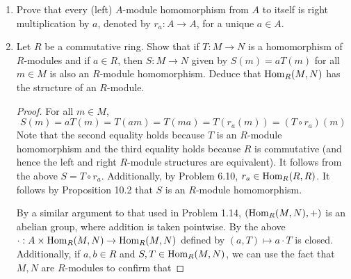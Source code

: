 \documentclass[../psets.tex]{subfiles}
\begin{document}
\begin{enumerate}
\begin{proof}
        Since $M=\ker(f)$ and $\oplus$ is commutative, $M\oplus R\cong R\oplus\ker(f)$. Thus, we need only prove that there is an isomorphism $R\oplus\ker(f)\to R^3$. To do so, Problem 6.7 tells us that it will suffice to show that $c=(x,y,z)\in R^3$, $xR+yR+zR=R$, and $f:R^3\to R$ satisfies $f(c)=1$. Let's begin.\par\smallskip
        For the first claim, we have by definition that $c\in R^3$.\par
        For the second claim, we have by definition that $xR+yR+zR\subset R$. Now let $r\in R$ be arbitrary. Then
        \begin{equation*}
            r = r\cdot 1
            = r\cdot(x^2+y^2+z^2)
            = x\cdot(rx)+y\cdot(ry)+z\cdot(rz)
            \in xR+yR+zR
        \end{equation*}
        as desired.\par
        For the third claim, we have that
        \begin{equation*}
            f(c) = f(x,y,z)
            = xx+yy+zz
            = x^2+y^2+z^2
            = 1
        \end{equation*}
        as desired.
    \end{proof}
    \item Prove that every (left) $A$-module homomorphism from $A$ to itself is right multiplication by $a$, denoted by $r_a:A\to A$, for a unique $a\in A$. %
    \item Let $R$ be a commutative ring. Show that if $T:M\to N$ is a homomorphism of $R$-modules and if $a\in R$, then $S:M\to N$ given by $S(m)=aT(m)$ for all $m\in M$ is also an $R$-module homomorphism. Deduce that $\operatorname{Hom}_R(M,N)$ has the structure of an $R$-module.
    \begin{proof}
        For all $m\in M$,
        \begin{equation*}
            S(m) = aT(m)
            = T(am)
            = T(ma)
            = T(r_a(m))
            = (T\circ r_a)(m)
        \end{equation*}
        Note that the second equality holds because $T$ is an $R$-module homomorphism and the third equality holds because $R$ is commutative (and hence the left and right $R$-module structures are equivalent). It follows from the above $S=T\circ r_a$. Additionally, by Problem 6.10, $r_a\in\operatorname{Hom}_R(R,R)$. It follows by Proposition 10.2 that $S$ is an $R$-module homomorphism.\par
        By a similar argument to that used in Problem 1.14, $(\operatorname{Hom}_R(M,N),+)$ is an abelian group, where addition is taken pointwise. By the above $\cdot:A\times\operatorname{Hom}_R(M,N)\to\operatorname{Hom}_R(M,N)$ defined by $(a,T)\mapsto a\cdot T$ is closed. Additionally, if $a,b\in R$ and $S,T\in\operatorname{Hom}_R(M,N)$, we can use the fact that $M,N$ are $R$-modules to confirm that

\end{proof}
\end{enumerate}
\end{document}

